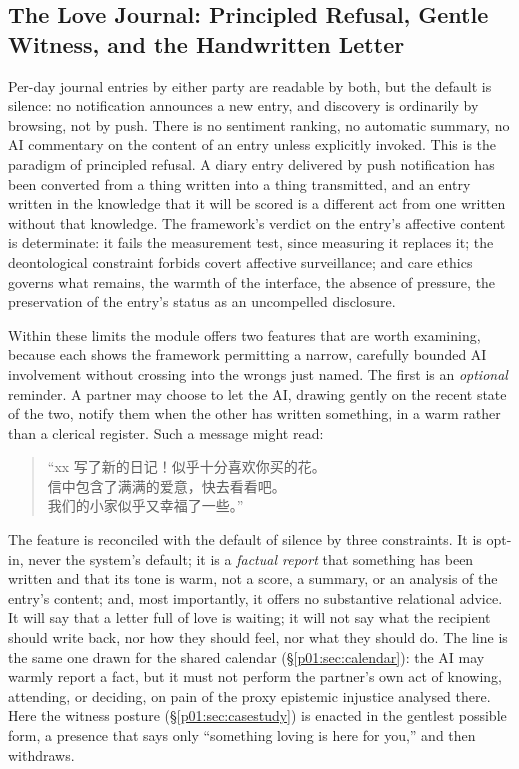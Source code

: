 \documentclass[11pt,a4paper]{article}
\begin{document}
\subsection{The Love Journal: Principled Refusal, Gentle Witness, and the Handwritten Letter}\label{p01:sec:diary}

Per-day journal entries by either party are readable by both, but the default is silence: no notification announces a new entry, and discovery is ordinarily by browsing, not by push. There is no sentiment ranking, no automatic summary, no AI commentary on the content of an entry unless explicitly invoked. This is the paradigm of principled refusal. A diary entry delivered by push notification has been converted from a thing written into a thing transmitted, and an entry written in the knowledge that it will be scored is a different act from one written without that knowledge. The framework's verdict on the entry's affective content is determinate: it fails the measurement test, since measuring it replaces it; the deontological constraint forbids covert affective surveillance; and care ethics governs what remains, the warmth of the interface, the absence of pressure, the preservation of the entry's status as an uncompelled disclosure.

Within these limits the module offers two features that are worth examining, because each shows the framework permitting a narrow, carefully bounded AI involvement without crossing into the wrongs just named. The first is an \emph{optional} reminder. A partner may choose to let the AI, drawing gently on the recent state of the two, notify them when the other has written something, in a warm rather than a clerical register. Such a message might read: \begin{quote}\small\cjkfont\color{ink}\raggedright ``xx 写了新的日记！似乎十分喜欢你买的花。\\信中包含了满满的爱意，快去看看吧。\\我们的小家似乎又幸福了一些。''\end{quote} The feature is reconciled with the default of silence by three constraints. It is opt-in, never the system's default; it is a \emph{factual report} that something has been written and that its tone is warm, not a score, a summary, or an analysis of the entry's content; and, most importantly, it offers no substantive relational advice. It will say that a letter full of love is waiting; it will not say what the recipient should write back, nor how they should feel, nor what they should do. The line is the same one drawn for the shared calendar (§\ref{p01:sec:calendar}): the AI may warmly report a fact, but it must not perform the partner's own act of knowing, attending, or deciding, on pain of the proxy epistemic injustice analysed there. Here the witness posture (§\ref{p01:sec:casestudy}) is enacted in the gentlest possible form, a presence that says only ``something loving is here for you,'' and then withdraws.
\end{document}
